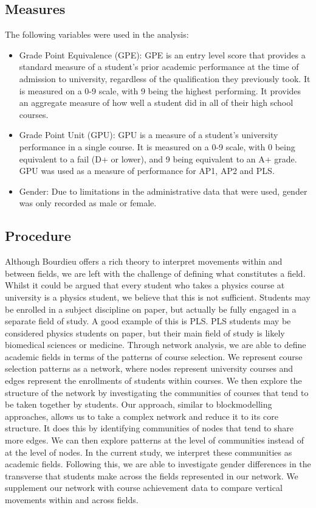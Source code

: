 \subsection{Measures}

The following variables were used in the analysis:
\begin{itemize}
\item{Grade Point Equivalence (GPE):} GPE is an entry level score that provides a standard measure of a student’s prior academic performance at the time of admission to university, regardless of the qualification they previously took. It is measured on a 0-9 scale, with 9 being the highest performing. It provides an aggregate measure of how well a student did in all of their high school courses.\cite{UoA_2016}

\item{Grade Point Unit (GPU):} GPU is a measure of a student’s university performance in a single course. It is measured on a 0-9 scale, with 0 being equivalent to a fail (D+ or lower), and 9 being equivalent to an A+ grade. GPU was used as a measure of performance for AP1, AP2 and PLS.
	
\item{Gender:} Due to limitations in the administrative data that were used, gender was only recorded as male or female. 

\end{itemize}

\subsection{Procedure}
Although Bourdieu offers a rich theory to interpret movements within and between fields, we are left with the challenge of defining what constitutes a field. Whilst it could be argued that every student who takes a physics course at university is a physics student, we believe that this is not sufficient. Students may be enrolled in a subject discipline on paper, but actually be fully engaged in a separate field of study. A good example of this is PLS. PLS students may be considered physics students on paper, but their main field of study is likely biomedical sciences or medicine. Through network analysis, we are able to define academic fields in terms of the patterns of course selection. We represent course selection patterns as a network, where nodes represent university courses and edges represent the enrollments of students within courses. We then explore the structure of the network by investigating the communities of courses that tend to be taken together by students. Our approach, similar to blockmodelling approaches\cite{bottero2011worlds,white1976social}, allows us to take a complex network and reduce it to its core structure. It does this by identifying communities of nodes that tend to share more edges. We can then explore patterns at the level of communities instead of at the level of nodes. In the current study, we interpret these communities as academic fields. Following this, we are able to investigate gender differences in the transverse that students make across the fields represented in our network. We supplement our network with course achievement data to compare vertical movements within and across fields. 

